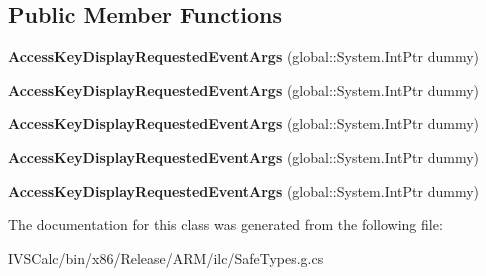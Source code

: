 \subsection*{Public Member Functions}
\begin{DoxyCompactItemize}
\item 
\mbox{\label{class_windows_1_1_u_i_1_1_xaml_1_1_input_1_1_access_key_display_requested_event_args_a13f8e6fd525a9102db478be5b18635bd}} 
{\bfseries Access\+Key\+Display\+Requested\+Event\+Args} (global\+::\+System.\+Int\+Ptr dummy)
\item 
\mbox{\label{class_windows_1_1_u_i_1_1_xaml_1_1_input_1_1_access_key_display_requested_event_args_a13f8e6fd525a9102db478be5b18635bd}} 
{\bfseries Access\+Key\+Display\+Requested\+Event\+Args} (global\+::\+System.\+Int\+Ptr dummy)
\item 
\mbox{\label{class_windows_1_1_u_i_1_1_xaml_1_1_input_1_1_access_key_display_requested_event_args_a13f8e6fd525a9102db478be5b18635bd}} 
{\bfseries Access\+Key\+Display\+Requested\+Event\+Args} (global\+::\+System.\+Int\+Ptr dummy)
\item 
\mbox{\label{class_windows_1_1_u_i_1_1_xaml_1_1_input_1_1_access_key_display_requested_event_args_a13f8e6fd525a9102db478be5b18635bd}} 
{\bfseries Access\+Key\+Display\+Requested\+Event\+Args} (global\+::\+System.\+Int\+Ptr dummy)
\item 
\mbox{\label{class_windows_1_1_u_i_1_1_xaml_1_1_input_1_1_access_key_display_requested_event_args_a13f8e6fd525a9102db478be5b18635bd}} 
{\bfseries Access\+Key\+Display\+Requested\+Event\+Args} (global\+::\+System.\+Int\+Ptr dummy)
\end{DoxyCompactItemize}


The documentation for this class was generated from the following file\+:\begin{DoxyCompactItemize}
\item 
I\+V\+S\+Calc/bin/x86/\+Release/\+A\+R\+M/ilc/Safe\+Types.\+g.\+cs\end{DoxyCompactItemize}
